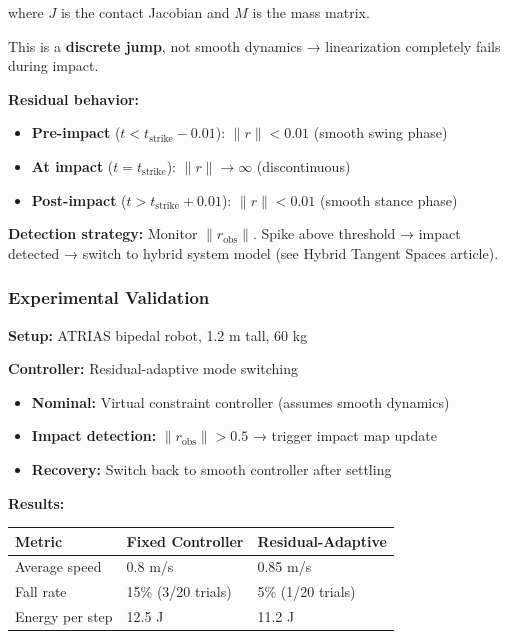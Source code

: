\documentclass[
  letterpaper,
  DIV=11,
  numbers=noendperiod]{scrartcl}
\providecommand{\tightlist}{%
  \setlength{\itemsep}{0pt}\setlength{\parskip}{0pt}}\usepackage{longtable,booktabs,array}
\begin{document}
where \(J\) is the contact Jacobian and \(M\) is the mass matrix.

This is a \textbf{discrete jump}, not smooth dynamics → linearization
completely fails during impact.

\textbf{Residual behavior:}

\begin{itemize}
\tightlist
\item
  \textbf{Pre-impact} (\(t < t_{\text{strike}} - 0.01\)):
  \(\|r\| < 0.01\) (smooth swing phase)
\item
  \textbf{At impact} (\(t = t_{\text{strike}}\)): \(\|r\| \to \infty\)
  (discontinuous)
\item
  \textbf{Post-impact} (\(t > t_{\text{strike}} + 0.01\)):
  \(\|r\| < 0.01\) (smooth stance phase)
\end{itemize}

\textbf{Detection strategy:} Monitor \(\|r_{\text{obs}}\|\). Spike above
threshold → impact detected → switch to hybrid system model (see Hybrid
Tangent Spaces article).

\subsubsection{Experimental Validation}\label{experimental-validation}

\textbf{Setup:} ATRIAS bipedal robot, 1.2 m tall, 60 kg

\textbf{Controller:} Residual-adaptive mode switching

\begin{itemize}
\tightlist
\item
  \textbf{Nominal:} Virtual constraint controller (assumes smooth
  dynamics)
\item
  \textbf{Impact detection:} \(\|r_{\text{obs}}\| > 0.5\) → trigger
  impact map update
\item
  \textbf{Recovery:} Switch back to smooth controller after settling
\end{itemize}

\textbf{Results:}

\begin{longtable}[]{@{}lll@{}}
\toprule\noalign{}
Metric & Fixed Controller & Residual-Adaptive \\
\midrule\noalign{}
\endhead
\bottomrule\noalign{}
\endlastfoot
Average speed & 0.8 m/s & 0.85 m/s \\
Fall rate & 15\% (3/20 trials) & 5\% (1/20 trials) \\
Energy per step & 12.5 J & 11.2 J \\
\end{longtable}
\end{document}
